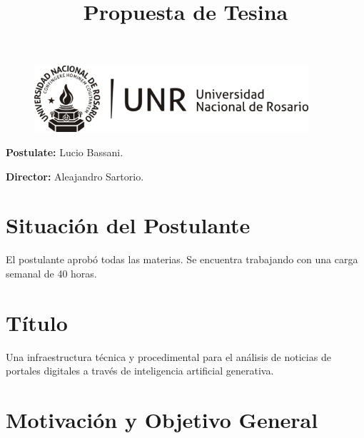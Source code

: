 \documentclass[12pt]{article}
\title{Propuesta de Tesina}
\begin{document}
\maketitle

\begin{figure}[h]
\centering
\includegraphics[width=4in]{LOGO-UNR-NEGRO.png}
\end{figure}

\textbf{Postulate:} Lucio Bassani.

\textbf{Director:} Aleajandro Sartorio.



\section{Situación del Postulante}
El postulante aprobó todas las materias. Se encuentra trabajando con una carga semanal de 40 horas.

\section{Título}
Una infraestructura técnica y procedimental para el análisis de noticias de portales digitales a través de inteligencia artificial generativa.



\section{Motivación y Objetivo General}

\end{document}
